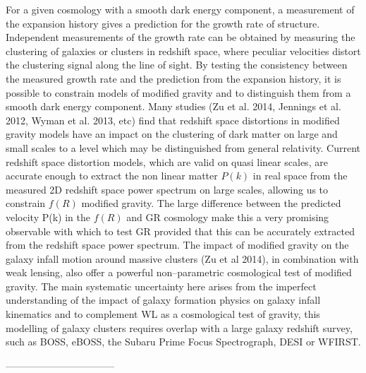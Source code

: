 For a given cosmology with a smooth dark energy component, a measurement of the expansion history gives a prediction for the growth rate of structure. Independent measurements of the growth rate can be obtained by measuring the clustering of galaxies or clusters in redshift space, where peculiar velocities distort the clustering signal along the line of sight. By testing the consistency between the measured growth rate and the prediction from the expansion history, it is possible to constrain models of modified gravity and to distinguish them from a smooth dark energy component.
Many studies (Zu et al. 2014, Jennings et al. 2012, Wyman et al. 2013, etc) find that redshift space distortions in modified gravity models have an impact on the clustering of dark matter on large and small scales to a level which may be distinguished from general relativity. Current redshift space distortion models, which are valid on quasi linear scales, are accurate enough to extract the non linear matter $P(k)$ in real space from the measured 2D redshift space power spectrum on large scales, allowing us to constrain $f(R)$ modified gravity. The large difference between the predicted velocity P(k) in the $f(R)$ and GR cosmology make this a very promising observable with which to test GR provided that this can be accurately extracted from the redshift space power spectrum. The impact of modified gravity on the galaxy
infall motion around massive clusters (Zu et al 2014),  in combination with weak lensing, also offer
a powerful non–parametric cosmological test of modified gravity. The main systematic uncertainty here arises from the imperfect understanding of the impact of galaxy formation physics on galaxy infall kinematics and to complement
WL as a cosmological test of gravity, this modelling of
galaxy clusters requires overlap with a large galaxy redshift survey,
such as BOSS, eBOSS, the Subaru Prime Focus
Spectrograph, DESI or WFIRST. 

---------------------------------

